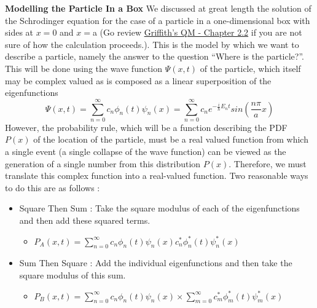 \documentclass[12pt]{article}
\begin{document}
\newpage
\textbf{Modelling the Particle In a Box} 
\newline
We discussed at great length the solution of the Schrodinger equation for the case of a particle in a one-dimensional box with sides at $x=$0 and $x=$a (Go review \href{http://www.fisica.net/mecanica-quantica/Griffiths\%20-\%20Introduction\%20to\%20quantum\%20mechanics.pdf}{Griffith's QM - Chapter 2.2} if you are not sure of how the calculation proceeds.).  This is the model by which we want to describe a particle, namely the answer to the question ``Where is the particle?''.  This will be done using the wave function $\Psi(x,t)$ of the particle, which itself may be complex valued as is composed as a linear superposition of the eigenfunctions 
\begin{displaymath}
 \Psi(x,t)=\displaystyle\sum_{n=0}^{\infty} c_{n}  \phi_{n}(t)  \psi_{n}(x) = \displaystyle\sum_{n=0}^{\infty} c_{n}  e^{-\frac{i}{\hbar}E_{n}t} sin(\frac{n\pi}{a}x)
\end{displaymath}
However, the probability rule, which will be a function describing the PDF $P(x)$ of the location of the particle, must be a real valued function from which a single event (a single collapse of the wave function) can be viewed as the generation of a single number from this distribution $P(x)$.  Therefore, we must translate this complex function into a real-valued function.  Two reasonable ways to do this are as follows :
\begin{itemize}
\item Square Then Sum : Take the square modulus of each of the eigenfunctions and then add these squared terms.
   \begin{itemize}
     \item $P_{A}(x,t)=\displaystyle\sum_{n=0}^{\infty}  c_{n}  \phi_{n}(t)  \psi_{n}(x) c_{n}^{*}  \phi_{n}^{*}(t)  \psi_{n}^{*}(x) $
   \end{itemize}
\item Sum Then Square : Add the individual eigenfunctions and then take the square modulus of this sum.
   \begin{itemize}
     \item $P_{B}(x,t)=\displaystyle\sum_{n=0}^{\infty}  c_{n}  \phi_{n}(t)  \psi_{n}(x) \times \displaystyle\sum_{m=0}^{\infty}  c_{m}^{*}  \phi_{m}^{*}(t)  \psi_{m}^{*}(x)$
   \end{itemize}
\end{itemize}
\end{document}
